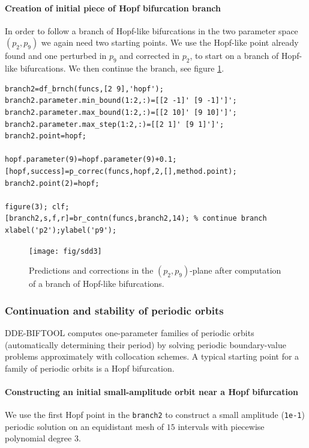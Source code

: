 \documentclass[10pt]{scrartcl}
\newcommand{\DDEBIFCODE}{\textsc{DDE-BIFTOOL}}
\newcommand{\blist}[1]{\mbox{\lstinline!#1!}}
\begin{document}
  \paragraph{Creation of initial piece of Hopf bifurcation branch}
In order to follow a branch of Hopf-like bifurcations in the two parameter
space $(p_2,p_9)$ we again need two starting points.
We use the Hopf-like point already found and one perturbed in $p_9$
and corrected in $p_2$, to start on a branch
of Hopf-like bifurcations. We then continue the branch, see figure \ref{br_hopf}.
\begin{lstlisting}
branch2=df_brnch(funcs,[2 9],'hopf');
branch2.parameter.min_bound(1:2,:)=[[2 -1]' [9 -1]']';
branch2.parameter.max_bound(1:2,:)=[[2 10]' [9 10]']';
branch2.parameter.max_step(1:2,:)=[[2 1]' [9 1]']';   
branch2.point=hopf;                                   

hopf.parameter(9)=hopf.parameter(9)+0.1;              
[hopf,success]=p_correc(funcs,hopf,2,[],method.point);
branch2.point(2)=hopf;                                

figure(3); clf;
[branch2,s,f,r]=br_contn(funcs,branch2,14); % continue branch
xlabel('p2');ylabel('p9');  
\end{lstlisting}
\begin{figure}[h]
\begin{center}
\texttt{[image: fig/sdd3]}
\end{center}
\caption{\small\label{br_hopf} Predictions and corrections
in the $(p_2,p_9)$-plane after computation of a branch of Hopf-like 
bifurcations.}
\end{figure}

\subsubsection{Continuation and stability of periodic orbits}
\label{sec:sd:psol}
\DDEBIFCODE{} computes one-parameter families of periodic orbits
(automatically determining their period) by solving periodic
boundary-value problems approximately with collocation schemes. A
typical starting point for a family of periodic orbits is a Hopf
bifurcation.

\paragraph{Constructing an initial small-amplitude orbit near a Hopf bifurcation}
We use the first Hopf point in the \blist{branch2} to construct a small
amplitude (\texttt{1e-1}) periodic solution on an equidistant mesh of $15$
intervals with piecewise polynomial degree $3$.
\end{document}
